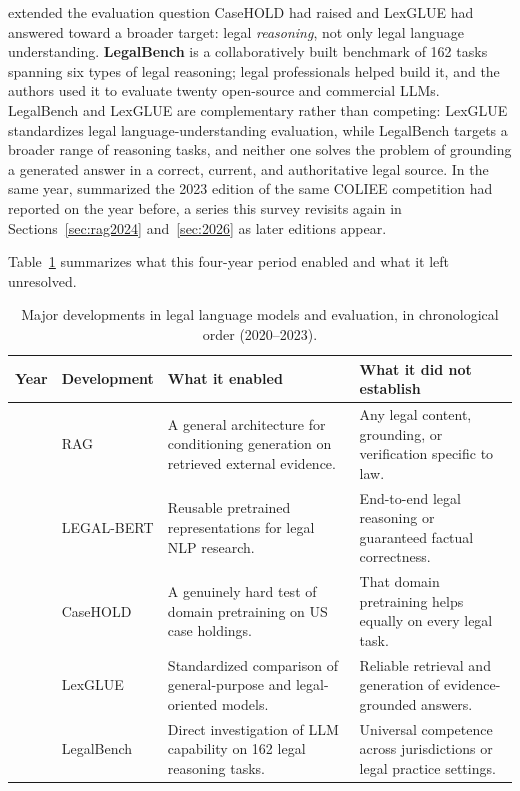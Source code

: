 \citet{guha2023} extended the evaluation question CaseHOLD had raised and LexGLUE had answered
toward a broader target: legal \emph{reasoning}, not only legal language understanding.
\textbf{LegalBench} is a collaboratively built benchmark of 162 tasks spanning six types of legal
reasoning; legal professionals helped build it, and the authors used it to evaluate twenty
open-source and commercial LLMs. LegalBench and LexGLUE are complementary rather than competing:
LexGLUE standardizes legal language-understanding evaluation, while LegalBench targets a broader
range of reasoning tasks, and neither one solves the problem of grounding a generated answer in a
correct, current, and authoritative legal source. In the same year, \citet{goebel2023} summarized
the 2023 edition of the same COLIEE competition \citet{rabelo2022} had reported on the year before,
a series this survey revisits again in Sections~\ref{sec:rag2024} and~\ref{sec:2026} as later
editions appear.

Table~\ref{tab:lmdev} summarizes what this four-year period enabled and what it left unresolved.

\begin{table}[tp]
\centering
\caption{Major developments in legal language models and evaluation, in chronological order (2020--2023).}
\label{tab:lmdev}
\footnotesize
\setlength{\tabcolsep}{5pt}
\renewcommand{\arraystretch}{1.25}
\begin{tabularx}{\textwidth}{>{\raggedright\arraybackslash}p{1.1cm} >{\raggedright\arraybackslash}p{2.6cm} >{\raggedright\arraybackslash}X >{\raggedright\arraybackslash}X}
\toprule
\textbf{Year} & \textbf{Development} & \textbf{What it enabled} & \textbf{What it did not establish} \\
\midrule
2020 & RAG \citep{lewis2020} & A general architecture for conditioning generation on retrieved external evidence. & Any legal content, grounding, or verification specific to law. \\
2020 & LEGAL-BERT \citep{chalkidis2020} & Reusable pretrained representations for legal NLP research. & End-to-end legal reasoning or guaranteed factual correctness. \\
2021 & CaseHOLD \citep{zheng2021} & A genuinely hard test of domain pretraining on US case holdings. & That domain pretraining helps equally on every legal task. \\
2022 & LexGLUE \citep{chalkidis2022} & Standardized comparison of general-purpose and legal-oriented models. & Reliable retrieval and generation of evidence-grounded answers. \\
2023 & LegalBench \citep{guha2023} & Direct investigation of LLM capability on 162 legal reasoning tasks. & Universal competence across jurisdictions or legal practice settings. \\
\bottomrule
\end{tabularx}
\end{table}

